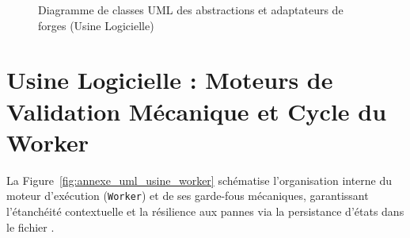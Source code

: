 \documentclass{tnreport}
\begin{document}
\begin{figure}[htbp]
\caption{Diagramme de classes UML des abstractions et adaptateurs de forges (Usine Logicielle)}
\label{fig:annexe_uml_usine_patterns}
\end{figure}

\cleardoublepage

\section{Usine Logicielle : Moteurs de Validation Mécanique et Cycle du Worker}
\label{annexe:sec_uml_usine_worker}

La Figure~\ref{fig:annexe_uml_usine_worker} schématise l'organisation interne du moteur d'exécution (\texttt{Worker}) et de ses garde-fous mécaniques, garantissant l'étanchéité contextuelle et la résilience aux pannes via la persistance d'états dans le fichier .
\end{document}
